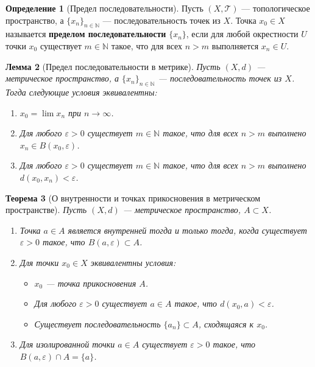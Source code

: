 \documentclass[12pt,a4paper]{article}
\newtheorem{theorem}{Теорема}[section]
\newtheorem{lemma}[theorem]{Лемма}
\theoremstyle{definition}
\newtheorem{definition}[theorem]{Определение}
\begin{document}
\begin{definition}[Предел последовательности]
Пусть $(X, \mathcal{T})$ --- топологическое пространство, а $\{x_n\}_{n \in \mathbb{N}}$ --- последовательность точек из $X$.
Точка $x_0 \in X$ называется \textbf{пределом последовательности} $\{x_n\}$, если для любой окрестности $U$ точки $x_0$ существует $m \in \mathbb{N}$ такое, что для всех $n > m$ выполняется $x_n \in U$.
\end{definition}

\begin{lemma}[Предел последовательности в метрике]
Пусть $(X, d)$ --- метрическое пространство, а $\{x_n\}_{n \in \mathbb{N}}$ --- последовательность точек из $X$. Тогда следующие условия эквивалентны:
\begin{enumerate}
    \item $x_0 = \lim x_n$ при $n \to \infty$.
    \item Для любого $\varepsilon > 0$ существует $m \in \mathbb{N}$ такое, что для всех $n > m$ выполнено $x_n \in B(x_0, \varepsilon)$.
    \item Для любого $\varepsilon > 0$ существует $m \in \mathbb{N}$ такое, что для всех $n > m$ выполнено $d(x_0, x_n) < \varepsilon$.
\end{enumerate}
\end{lemma}

\begin{theorem}[О внутренности и точках прикосновения в метрическом пространстве]
Пусть $(X, d)$ --- метрическое пространство, $A \subset X$.
\begin{enumerate}
    \item Точка $a \in A$ является внутренней тогда и только тогда, когда существует $\varepsilon > 0$ такое, что $B(a, \varepsilon) \subset A$.
    \item Для точки $x_0 \in X$ эквивалентны условия:
    \begin{itemize}
        \item $x_0$ --- точка прикосновения $A$.
        \item Для любого $\varepsilon > 0$ существует $a \in A$ такое, что $d(x_0, a) < \varepsilon$.
        \item Существует последовательность $\{a_n\} \subset A$, сходящаяся к $x_0$.
    \end{itemize}
    \item Для изолированной точки $a \in A$ существует $\varepsilon > 0$ такое, что $B(a, \varepsilon) \cap A = \{a\}$.
\end{enumerate}
\end{theorem}
\end{document}
